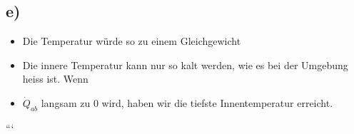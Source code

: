 

\subsection*{e)}
\begin{itemize}
    \item Die Temperatur würde so zu einem Gleichgewicht
    \item Die innere Temperatur kann nur so kalt werden, wie es bei der Umgebung heiss ist. Wenn 
    \item $\dot{Q}_{ab}$ langsam zu 0 wird, haben wir die tiefste Innentemperatur erreicht.
\end{itemize}

```